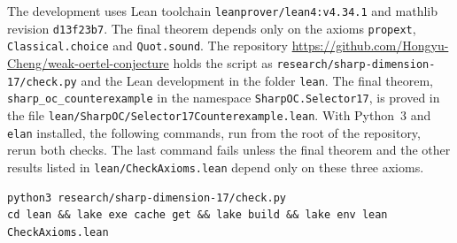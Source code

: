 \documentclass[11pt]{article}
\newcommand{\1}{\mathbf{1}}
\begin{document}
The development uses Lean toolchain \texttt{leanprover/lean4:v4.34.1} and mathlib revision \texttt{d13f23b7}. The final
theorem depends only on the axioms \texttt{propext}, \texttt{Classical.choice} and \texttt{Quot.sound}. The repository
\url{https://github.com/Hongyu-Cheng/weak-oertel-conjecture} holds the script as
\nolinkurl{research/sharp-dimension-17/check.py} and the Lean development in the folder \texttt{lean}. The final theorem,
\texttt{sharp\_oc\_counterexample} in the namespace \texttt{SharpOC.Selector17}, is proved in the file
\nolinkurl{lean/SharpOC/Selector17Counterexample.lean}. With
Python~3 and \texttt{elan} installed, the following commands, run from the root of the repository, rerun both checks. The
last command fails unless the final theorem and the other results listed in \nolinkurl{lean/CheckAxioms.lean} depend only
on these three axioms.
\begin{Verbatim}
python3 research/sharp-dimension-17/check.py
cd lean && lake exe cache get && lake build && lake env lean CheckAxioms.lean
\end{Verbatim}
\end{document}
